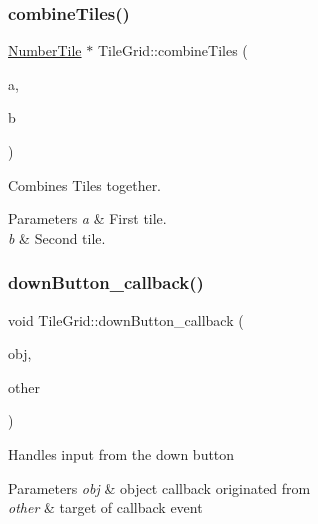 \subsubsection{\texorpdfstring{combine\+Tiles()}{combineTiles()}}
{\footnotesize\ttfamily \hyperlink{classNumberTile}{Number\+Tile} $\ast$ Tile\+Grid\+::combine\+Tiles (\begin{DoxyParamCaption}\item[{\hyperlink{classNumberTile}{Number\+Tile} $\ast$}]{a,  }\item[{\hyperlink{classNumberTile}{Number\+Tile} $\ast$}]{b }\end{DoxyParamCaption})}

Combines Tiles together.


\begin{DoxyParams}{Parameters}
{\em a} & First tile. \\
\hline
{\em b} & Second tile. \\
\hline
\end{DoxyParams}
\mbox{\label{classTileGrid_a6c2e41e7f4ed1a6872c712155ef99888}} 
\subsubsection{\texorpdfstring{down\+Button\+\_\+callback()}{downButton\_callback()}}
{\footnotesize\ttfamily void Tile\+Grid\+::down\+Button\+\_\+callback (\begin{DoxyParamCaption}\item[{Fl\+\_\+\+Widget $\ast$}]{obj,  }\item[{void $\ast$}]{other }\end{DoxyParamCaption})\hspace{0.3cm}{\ttfamily [static]}}

Handles input from the down button


\begin{DoxyParams}{Parameters}
{\em obj} & object callback originated from \\
\hline
{\em other} & target of callback event \\
\hline
\end{DoxyParams}
\mbox{\label{classTileGrid_a3da76928cfce1d715cefde4c80759187}} 
